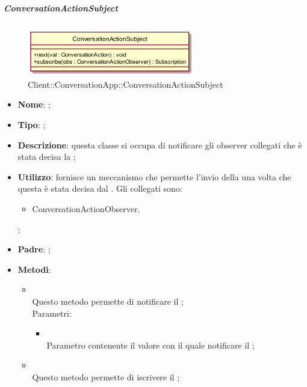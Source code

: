 \hypertarget{ConversationActionSubject_label}{\subparagraph{ConversationActionSubject}}
\begin{figure}[h]
	\centering
	\includegraphics[width=0.65\textwidth,height=\textheight,keepaspectratio]{images/ClassConversationActionSubject.png}
	\caption{Client::ConversationApp::ConversationActionSubject}
\end{figure}
\begin{itemize}
	\item \textbf{Nome}: ;
	\item \textbf{Tipo}: ;
	\item \textbf{Descrizione}: questa classe si occupa di notificare gli observer collegati che è stata decisa la ;
	\item \textbf{Utilizzo}: fornisce un meccanismo che permette l'invio della  una volta che questa è stata decisa dal .
	Gli  collegati sono:
	\begin{itemize}
		\item ConversationActionObserver.
	\end{itemize};
	\item \textbf{Padre}: ;
	\item \textbf{Metodi}:
	\begin{itemize}
		\item[]  \\		Questo metodo permette di notificare il ;\\
		Parametri:
		\begin{itemize}
			\item {} \\
			Parametro contenente il valore con il quale notificare il ;
		\end{itemize}
		\item[]  \\		Questo metodo permette di iscrivere il ;\\

\end{itemize}
\end{itemize}
